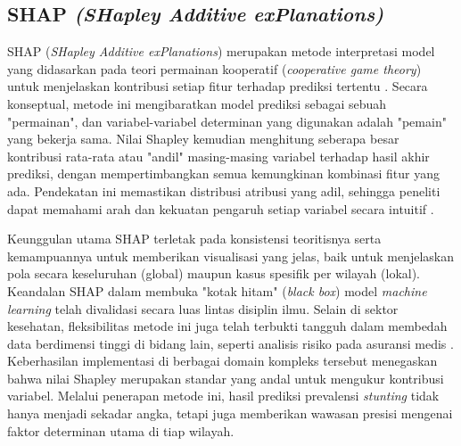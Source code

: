 \subsection{SHAP \textit{(SHapley Additive exPlanations)}}
SHAP (\textit{SHapley Additive exPlanations}) merupakan metode interpretasi model yang didasarkan pada teori permainan kooperatif (\textit{cooperative game theory}) untuk menjelaskan kontribusi setiap fitur terhadap prediksi tertentu \cite{lundberg2017unified}. Secara konseptual, metode ini mengibaratkan model prediksi sebagai sebuah "permainan", dan variabel-variabel determinan yang digunakan adalah "pemain" yang bekerja sama. Nilai Shapley kemudian menghitung seberapa besar kontribusi rata-rata atau "andil" masing-masing variabel terhadap hasil akhir prediksi, dengan mempertimbangkan semua kemungkinan kombinasi fitur yang ada. Pendekatan ini memastikan distribusi atribusi yang adil, sehingga peneliti dapat memahami arah dan kekuatan pengaruh setiap variabel secara intuitif \cite{lundberg2017unified}.

Keunggulan utama SHAP terletak pada konsistensi teoritisnya serta kemampuannya untuk memberikan visualisasi yang jelas, baik untuk menjelaskan pola secara keseluruhan (global) maupun kasus spesifik per wilayah (lokal). Keandalan SHAP dalam membuka "kotak hitam" (\textit{black box}) model \textit{machine learning} telah divalidasi secara luas lintas disiplin ilmu. Selain di sektor kesehatan, fleksibilitas metode ini juga telah terbukti tangguh dalam membedah data berdimensi tinggi di bidang lain, seperti analisis risiko pada asuransi medis \cite{orji2024machine}. Keberhasilan implementasi di berbagai domain kompleks tersebut menegaskan bahwa nilai Shapley merupakan standar yang andal untuk mengukur kontribusi variabel. Melalui penerapan metode ini, hasil prediksi prevalensi \textit{stunting} tidak hanya menjadi sekadar angka, tetapi juga memberikan wawasan presisi mengenai faktor determinan utama di tiap wilayah.